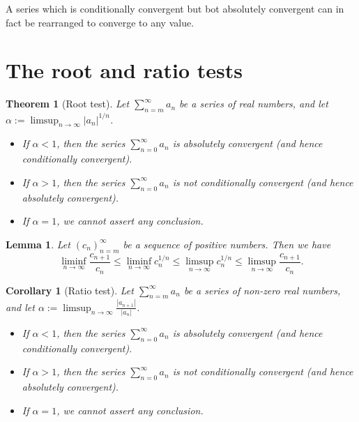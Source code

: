 \documentclass[
]{book}
\providecommand{\tightlist}{%
  \setlength{\itemsep}{0pt}\setlength{\parskip}{0pt}}
\newtheorem{theorem}{Theorem}[chapter]
\newtheorem{lemma}{Lemma}[chapter]
\newtheorem{corollary}{Corollary}[chapter]
\theoremstyle{definition}
\theoremstyle{definition}
\theoremstyle{definition}
\theoremstyle{definition}
\theoremstyle{remark}
\begin{document}
A series which is conditionally convergent but bot absolutely convergent can in fact be rearranged to converge to any value.

\section{The root and ratio tests}\label{the-root-and-ratio-tests}

\begin{theorem}[Root test]

Let \(\sum_{n=m}^{\infty}a_n\) be a series of real numbers, and let \(\alpha:=\limsup_{n\to \infty}|a_n|^{1/n}\).

\begin{itemize}
\tightlist
\item
  If \(\alpha<1\), then the series \(\sum_{n=0}^{\infty}a_n\) is absolutely convergent (and hence conditionally convergent).
\item
  If \(\alpha>1\), then the series \(\sum_{n=0}^{\infty}a_n\) is not conditionally convergent (and hence absolutely convergent).
\item
  If \(\alpha=1\), we cannot assert any conclusion.
\end{itemize}

\end{theorem}

\begin{lemma}
Let \((c_n)_{n=m}^{\infty}\) be a sequence of positive numbers. Then we have
\[
\liminf_{n\to\infty}\frac{c_{n+1}}{c_n} \leq \liminf_{n\to\infty}c_n^{1/n} \leq \limsup_{n\to\infty}c_n^{1/n} \leq \limsup_{n\to\infty}\frac{c_{n+1}}{c_n}.
\]
\end{lemma}

\begin{corollary}[Ratio test]

Let \(\sum_{n=m}^{\infty}a_n\) be a series of non-zero real numbers, and let \(\alpha:=\limsup_{n\to \infty}\frac{|a_{n+1}|}{|a_n|}\).

\begin{itemize}
\tightlist
\item
  If \(\alpha<1\), then the series \(\sum_{n=0}^{\infty}a_n\) is absolutely convergent (and hence conditionally convergent).
\item
  If \(\alpha>1\), then the series \(\sum_{n=0}^{\infty}a_n\) is not conditionally convergent (and hence absolutely convergent).
\item
  If \(\alpha=1\), we cannot assert any conclusion.
\end{itemize}

\end{corollary}
\end{document}

